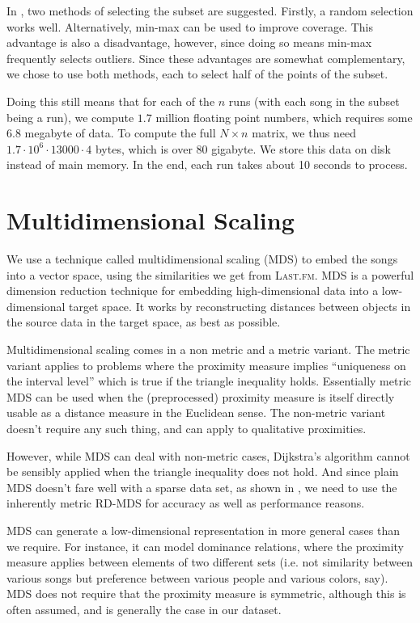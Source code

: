 \documentclass[10pt,fleqn,a4paper]{article}
\newcommand{\lastfm}{\textsc{Last.fm}}
\begin{document}
\begin{twocolumn}
In \cite{desilva:sms}, two methods of selecting the subset are suggested.  Firstly, a random selection works well.  Alternatively, min-max can be used to improve coverage.  This advantage is also a disadvantage, however, since doing so means min-max frequently selects outliers.  Since these advantages are somewhat complementary, we chose to use both methods, each to select half of the points of the subset.

Doing this still means that for each of the $n$ runs (with each song in the subset being a run), we compute $1.7$ million floating point numbers, which requires some $6.8$ megabyte of data. To compute the full $N \times n$ matrix, we thus need $1.7 \cdot 10^6 \cdot 13000 \cdot 4$ bytes, which is over $80$ gigabyte. We store this data on disk instead of main memory. In the end, each run takes about 10 seconds to process.

\section{Multidimensional Scaling}

We use a technique called multidimensional scaling (MDS) to embed the songs into a vector space, using the similarities we get from \lastfm. MDS is a powerful dimension reduction technique for embedding high-dimensional data into a low-dimensional target space. It works by reconstructing distances between objects in the source data in the target space, as best as possible.

Multidimensional scaling comes in a non metric and a metric variant. The metric variant applies to problems where the proximity measure implies ``uniqueness on the interval level'' which is true if the triangle inequality holds. Essentially metric MDS can be used when the (preprocessed) proximity measure is itself directly usable as a distance measure in the Euclidean sense. The non-metric variant doesn't require any such thing, and can apply to qualitative proximities.

However, while MDS can deal with non-metric cases, Dijkstra's algorithm cannot be sensibly applied when the triangle inequality does not hold. And since plain MDS doesn't fare well with a sparse data set, as shown in \cite{platt2004fes}, we need to use the inherently metric RD-MDS for accuracy as well as performance reasons.

MDS can generate a low-dimensional representation in more general cases than we require.  For instance, it can model dominance relations, where the proximity measure applies between elements of two different sets (i.e. not similarity between various songs but preference between various people and various colors, say).  MDS does not require that the proximity measure is symmetric, although this is often assumed, and is generally the case in our dataset.


\end{twocolumn}
\end{document}
